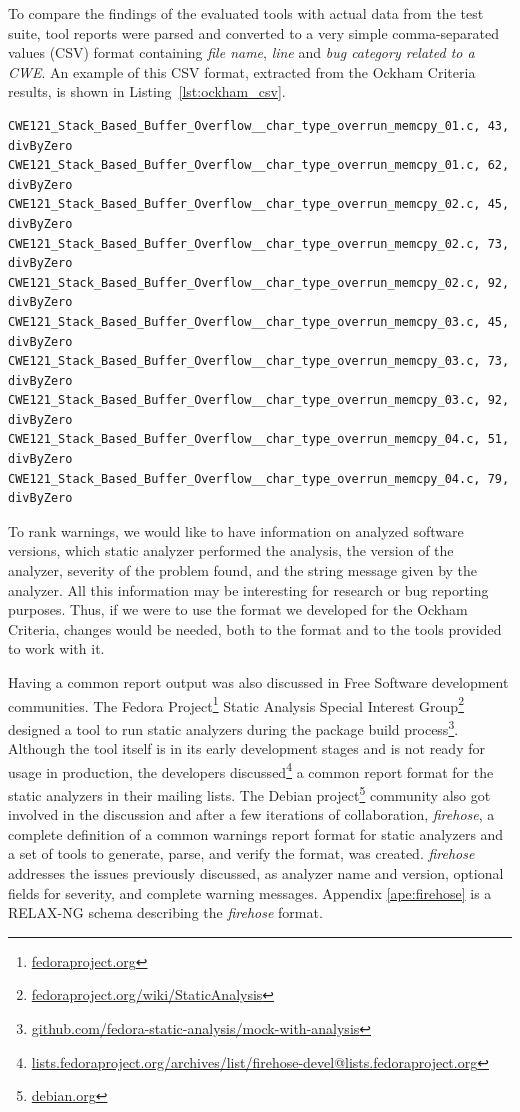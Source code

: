 To compare the findings of the evaluated tools with actual data from the test suite,
tool reports were parsed and converted to a very simple comma-separated values
(CSV) format containing \textit{file name}, \textit{line} and \textit{bug category
related to a CWE}. An example of this CSV format, extracted from the Ockham
Criteria results, is shown in Listing~\ref{lst:ockham_csv}.

\lstset{language=Python}
\begin{lstlisting}[caption={Ockham Criteria CSV bug report example},label={lst:ockham_csv}]
CWE121_Stack_Based_Buffer_Overflow__char_type_overrun_memcpy_01.c, 43, divByZero
CWE121_Stack_Based_Buffer_Overflow__char_type_overrun_memcpy_01.c, 62, divByZero
CWE121_Stack_Based_Buffer_Overflow__char_type_overrun_memcpy_02.c, 45, divByZero
CWE121_Stack_Based_Buffer_Overflow__char_type_overrun_memcpy_02.c, 73, divByZero
CWE121_Stack_Based_Buffer_Overflow__char_type_overrun_memcpy_02.c, 92, divByZero
CWE121_Stack_Based_Buffer_Overflow__char_type_overrun_memcpy_03.c, 45, divByZero
CWE121_Stack_Based_Buffer_Overflow__char_type_overrun_memcpy_03.c, 73, divByZero
CWE121_Stack_Based_Buffer_Overflow__char_type_overrun_memcpy_03.c, 92, divByZero
CWE121_Stack_Based_Buffer_Overflow__char_type_overrun_memcpy_04.c, 51, divByZero
CWE121_Stack_Based_Buffer_Overflow__char_type_overrun_memcpy_04.c, 79, divByZero
\end{lstlisting}

To rank warnings, we would like to have information on analyzed software
versions, which static analyzer performed the analysis, the version of the
analyzer, severity of the problem found, and the string message given by the
analyzer. All this information may be interesting for research or bug reporting
purposes. Thus, if we were to use the format we developed for the Ockham Criteria,
changes would be needed, both to the format and to the tools provided to work
with it.

Having a common report output was also discussed in Free Software development
communities. The Fedora Project\footnote{\url{fedoraproject.org}} Static
Analysis Special Interest
Group\footnote{\url{fedoraproject.org/wiki/StaticAnalysis}} designed a tool to
run static analyzers during the package build
process\footnote{\url{github.com/fedora-static-analysis/mock-with-analysis}}.
Although the tool itself is in its early development stages and is not ready
for usage in production, the developers
discussed\footnote{\url{lists.fedoraproject.org/archives/list/firehose-devel@lists.fedoraproject.org}}
a common report format for the static analyzers in their mailing lists. The
Debian project\footnote{\url{debian.org}} community also got involved in the
discussion and  after a few iterations of collaboration, \textit{firehose}, a
complete definition of a common warnings report format for static analyzers and
a set of tools to generate, parse, and verify the format, was created.
\textit{firehose} addresses the issues previously discussed, as analyzer name
and version, optional fields for severity, and complete warning messages.
Appendix \ref{ape:firehose} is a RELAX-NG schema describing the
\textit{firehose} format.

